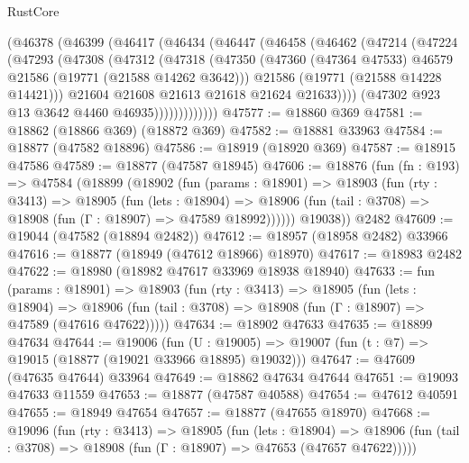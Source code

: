 \begin{lexlean}{RustCore}
\begin{coremodule}
          (@46378
            (@46399
              (@46417
                (@46434
                  (@46447
                    (@46458
                      (@46462
                        (@47214
                          (@47224
                            (@47293
                              (@47308
                                (@47312
                                  (@47318
                                    (@47350
                                      (@47360
                                        (@47364 @47533)
                                        @46579
                                        @21586
                                        (@19771 (@21588 @14262 @3642)))
                                      @21586
                                      (@19771 (@21588 @14228 @14421)))
                                    @21604
                                    @21608
                                    @21613
                                    @21618
                                    @21624
                                    @21633))))
                            (@47302 @923 @13 @3642 @4460 @46935)))))))))))))
@47577 := @18860 @369
@47581 := @18862 (@18866 @369) (@18872 @369)
@47582 := @18881 @33963
@47584 := @18877 (@47582 @18896)
@47586 := @18919 (@18920 @369)
@47587 := @18915 @47586
@47589 := @18877 (@47587 @18945)
@47606 := @18876
    (fun (fn : @193) =>
    @47584
      (@18899
        (@18902
          (fun (params : @18901) =>
          @18903
            (fun (rty : @3413) =>
            @18905
              (fun (lets : @18904) =>
              @18906 (fun (tail : @3708) => @18908 (fun (Γ : @18907) => @47589 @18992))))))
        @19038))
    @2482
@47609 := @19044 (@47582 (@18894 @2482))
@47612 := @18957 (@18958 @2482) @33966
@47616 := @18877 (@18949 (@47612 @18966) @18970)
@47617 := @18983 @2482
@47622 := @18980 (@18982 @47617 @33969 @18938 @18940)
@47633 := fun (params : @18901) =>
  @18903
    (fun (rty : @3413) =>
    @18905
      (fun (lets : @18904) =>
      @18906 (fun (tail : @3708) => @18908 (fun (Γ : @18907) => @47589 (@47616 @47622)))))
@47634 := @18902 @47633
@47635 := @18899 @47634
@47644 := @19006
    (fun (U : @19005) => @19007 (fun (t : @7) => @19015 (@18877 (@19021 @33966 @18895) @19032)))
@47647 := @47609 (@47635 @47644) @33964
@47649 := @18862 @47634 @47644
@47651 := @19093 @47633 @11559
@47653 := @18877 (@47587 @40588)
@47654 := @47612 @40591
@47655 := @18949 @47654
@47657 := @18877 (@47655 @18970)
@47668 := @19096
    (fun (rty : @3413) =>
    @18905
      (fun (lets : @18904) =>
      @18906 (fun (tail : @3708) => @18908 (fun (Γ : @18907) => @47653 (@47657 @47622)))))

\end{coremodule}
\end{lexlean}
